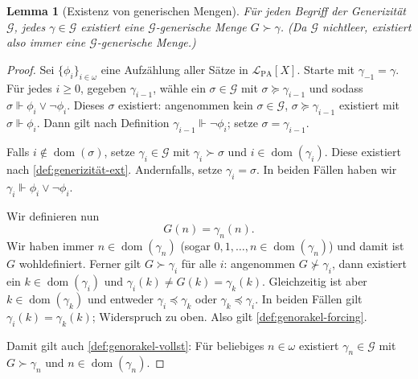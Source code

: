 \documentclass[nofonts]{uebung}
\newtheorem{lemma}[theorem]{Lemma}
\theoremstyle{definition}
\DeclareMathOperator{\dom}{dom}
\begin{document}
\begin{lemma}[Existenz von generischen Mengen]\label{lemma:generics-existieren}
    Für jeden Begriff der Generizität $\mathcal G$, jedes $\gamma\in\mathcal G$ existiert eine $\mathcal G$-generische Menge $G\succ \gamma$.
    (Da $\mathcal G$ nichtleer, existiert also immer eine $\mathcal G$-generische Menge.)
\end{lemma}
\begin{proof}
    Sei $\{\phi_i\}_{i\in\omega}$ eine Aufzählung aller Sätze in $\mathcal L_{\mathrm{PA}}[X]$. 
    Starte mit $\gamma_{-1}=\gamma$. Für jedes $i\geq 0$, gegeben $\gamma_{i-1}$, wähle ein $\sigma\in\mathcal G$ mit $\sigma\succeq\gamma_{i-1}$ und sodass $\sigma \Vdash \phi_i\lor\neg\phi_i$. Dieses $\sigma$ existiert: angenommen kein $\sigma\in\mathcal G$, $\sigma\succeq\gamma_{i-1}$ existiert mit $\sigma\Vdash \phi_i$. Dann gilt nach Definition $\gamma_{i-1}\Vdash\neg\phi_i$; setze $\sigma=\gamma_{i-1}$.

    Falls $i\not\in\dom(\sigma)$, setze $\gamma_i\in\mathcal G$ mit $\gamma_i\succ\sigma$ und $i\in\dom(\gamma_i)$. Diese existiert nach \ref{def:generizität-ext}.
    Andernfalls, setze $\gamma_i=\sigma$.
    In beiden Fällen haben wir $\gamma_i\Vdash \phi_i\lor\neg\phi_i$.

    Wir definieren nun
    \[ G(n) = \gamma_n(n). \]
    Wir haben immer $n\in\dom(\gamma_n)$ (sogar $0,1,\dots, n\in\dom(\gamma_n)$) und damit ist $G$ wohldefiniert.
    Ferner gilt $G\succ\gamma_i$ für alle $i$: angenommen $G\not\succ\gamma_i$, dann existiert ein $k\in\dom(\gamma_i)$ und $\gamma_i(k)\neq G(k)=\gamma_k(k)$.
    Gleichzeitig ist aber $k\in\dom(\gamma_k)$ und entweder $\gamma_i\preceq \gamma_k$ oder $\gamma_k\preceq \gamma_i$. In beiden Fällen gilt $\gamma_i(k)=\gamma_k(k)$; Widerspruch zu oben.
    Also gilt \ref{def:genorakel-forcing}.

    Damit gilt auch \ref{def:genorakel-vollst}: Für beliebiges $n\in\omega$ existiert $\gamma_n\in\mathcal G$ mit $G\succ \gamma_n$ und $n\in\dom(\gamma_n)$.
\end{proof}
\end{document}
